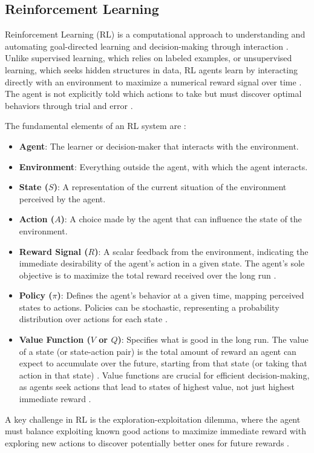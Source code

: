 \subsection{Reinforcement Learning}
Reinforcement Learning (RL) is a computational approach to understanding and automating goal-directed learning and decision-making through interaction \cite{Sutton2018ReinforcementL}. Unlike supervised learning, which relies on labeled examples, or unsupervised learning, which seeks hidden structures in data, RL agents learn by interacting directly with an environment to maximize a numerical reward signal over time \cite{Sutton2018ReinforcementL}. The agent is not explicitly told which actions to take but must discover optimal behaviors through trial and error \cite{Sutton2018ReinforcementL}.

The fundamental elements of an RL system are \cite{Sutton2018ReinforcementL}:
\begin{itemize}
    \item \textbf{Agent}: The learner or decision-maker that interacts with the environment.
    \item \textbf{Environment}: Everything outside the agent, with which the agent interacts.
    \item \textbf{State ($S$)}: A representation of the current situation of the environment perceived by the agent.
    \item \textbf{Action ($A$)}: A choice made by the agent that can influence the state of the environment.
    \item \textbf{Reward Signal ($R$)}: A scalar feedback from the environment, indicating the immediate desirability of the agent's action in a given state. The agent's sole objective is to maximize the total reward received over the long run \cite{Sutton2018ReinforcementL}.
    \item \textbf{Policy ($\pi$)}: Defines the agent's behavior at a given time, mapping perceived states to actions. Policies can be stochastic, representing a probability distribution over actions for each state \cite{Sutton2018ReinforcementL}.
    \item \textbf{Value Function ($V$ or $Q$)}: Specifies what is good in the long run. The value of a state (or state-action pair) is the total amount of reward an agent can expect to accumulate over the future, starting from that state (or taking that action in that state) \cite{Sutton2018ReinforcementL}. Value functions are crucial for efficient decision-making, as agents seek actions that lead to states of highest value, not just highest immediate reward \cite{Sutton2018ReinforcementL}.
\end{itemize}
A key challenge in RL is the exploration-exploitation dilemma, where the agent must balance exploiting known good actions to maximize immediate reward with exploring new actions to discover potentially better ones for future rewards \cite{Sutton2018ReinforcementL}.

